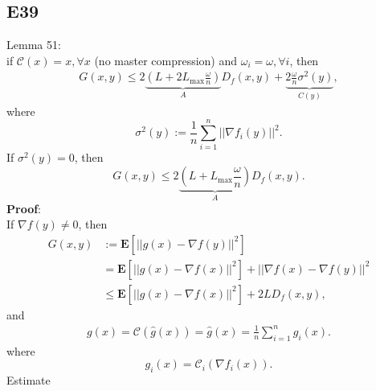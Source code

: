 \documentclass[12pt]{article}
\begin{document}
\subsection*{E39}
Lemma 51: \\
if $\mathcal{C}(x) = x, \forall x$ (no master compression) and $\omega_i = \omega,\forall i$, then
\begin{equation*}
    \begin{split}
        G(x,y) \leq 2 \underbrace{\left(L + 2L_{\text{max}}\frac{\omega}{n}\right)}_{A}D_f(x,y) + \underbrace{2\frac{\omega}{n}\sigma^2(y)}_{C(y)},
    \end{split}
\end{equation*}
where
\begin{equation*}
    \sigma^2(y) := \frac{1}{n}\sum_{i=1}^n ||\nabla f_i(y)||^2.
\end{equation*}
If $\sigma^2(y) = 0$, then
\begin{equation*}
    G(x,y) \leq 2 \underbrace{\left(L + L_{\text{max}}\frac{\omega}{n}\right)}_{A}D_f(x,y).
\end{equation*}
\textbf{Proof}: \\
If $\nabla f(y) \neq 0$, then
\begin{equation}
    \begin{split}
        G(x,y) &:= \mathbf{E}\left[ ||g(x) - \nabla f(y)||^2 \right] \\
                &= \mathbf{E}\left[ ||g(x) - \nabla f(x)||^2 \right] + ||\nabla f(x) - \nabla f(y)||^2 \\
                &\leq \mathbf{E}\left[ ||g(x) - \nabla f(x)||^2 \right] + 2LD_f(x,y),
    \end{split}
\end{equation}
and
\begin{equation}
    \begin{split}
        g(x)   = \mathcal{C}(\hat{g}(x)) = \hat{g}(x) = \frac{1}{n}\sum_{i=1}^n g_i(x).
    \end{split}
    \label{eq:p9g}
\end{equation}
where
\begin{equation*}
    g_i(x) = \mathcal{C}_i(\nabla f_i (x)).
\end{equation*}
Estimate
\end{document}
